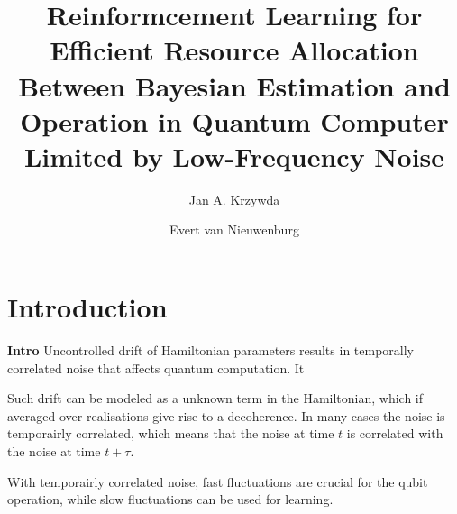 \documentclass[aps,twocolumn,pra,notitlepage,]{revtex4-2}
\begin{document}
\author{Jan A. Krzywda}
\author{Evert van Nieuwenburg}

\title{Reinformcement Learning for Efficient Resource Allocation Between Bayesian Estimation and Operation in Quantum Computer Limited by Low-Frequency Noise} 


\begin{abstract}

\end{abstract}
\maketitle

\section{Introduction}
\textbf{Intro} Uncontrolled drift of Hamiltonian parameters results in temporally correlated noise that affects quantum computation. It 

Such drift can be modeled as a unknown term in the Hamiltonian, which if averaged over realisations give rise to a decoherence. In many cases the noise is temporairly correlated, which means that the noise at time $t$ is correlated with the noise at time $t+\tau$. 



With temporairly correlated noise, fast fluctuations are crucial for the qubit operation, while slow fluctuations can be used for learning.
\end{document}
